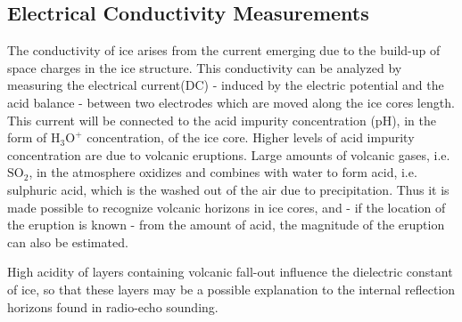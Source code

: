 \documentclass[../../CompleteThesis2/Complete_2ndDraft]{subfiles}
\begin{document}
\subsection[ECM][ECM]{Electrical Conductivity Measurements}
\label{Sec:Ice_ECMandDEP_ECM}


The conductivity of ice arises from the current emerging due to the build-up of space charges in the ice structure. This conductivity can be analyzed by measuring the electrical current(DC) - induced by the electric potential and the acid balance - between two electrodes which are moved along the ice cores length. This current will be connected to the acid impurity concentration (pH), in the form of $\text{H}_3\text{O}^+$ concentration, of the ice core. Higher levels of acid impurity concentration are due to volcanic eruptions. Large amounts of volcanic gases, i.e. $\text{SO}_2$, in the atmosphere oxidizes and combines with water to form acid, i.e. sulphuric acid, which is the washed out of the air due to precipitation. Thus it is made possible to recognize volcanic horizons in ice cores, and - if the location of the eruption is known - from the amount of acid, the magnitude of the eruption can also be estimated.

High acidity of layers containing volcanic fall-out influence the dielectric constant of ice, so that these layers may be a possible explanation to the internal reflection horizons found in radio-echo sounding. 
\end{document}
